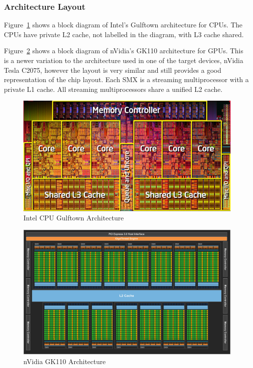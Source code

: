 \subsubsection{Architecture Layout}

Figure~\ref{fig:gulftownArchitecture} shows a block diagram of Intel's Gulftown
architecture for CPUs. The CPUs have private L2 cache, not labelled in the
diagram, with L3 cache shared.

Figure~\ref{fig:gk110Architecture} shows a block diagram of nVidia's GK110
architecture for GPUs. This is a newer variation to the architecture used in one
of the target devices, nVidia Tesla C2075, however the layout is very similar
and still provides a good representation of the chip layout. Each SMX is a
streaming multiprocessor with a private L1 cache. All streaming multiprocessors
share a unified L2 cache.

\begin{figure}[H]
\includegraphics[width=\linewidth]{images/gulftownArchitecture.jpg}
\caption{Intel CPU Gulftown Architecture}
\label{fig:gulftownArchitecture}
\end{figure}

\begin{figure}[H]
\includegraphics[width=\linewidth]{images/gk110Architecture.jpg}
\caption{nVidia GK110 Architecture}
\label{fig:gk110Architecture}
\end{figure}

